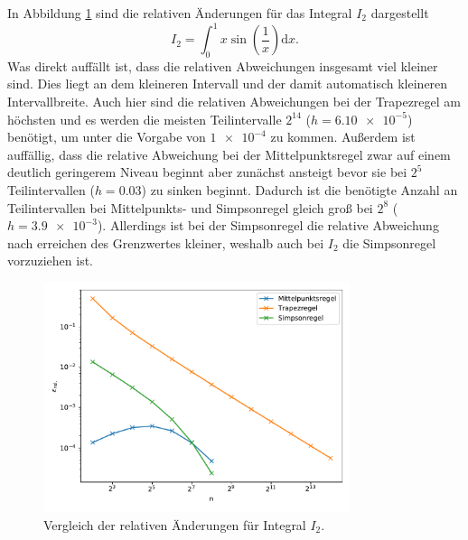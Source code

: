 In Abbildung \ref{fig:I2} sind die relativen Änderungen für das Integral \(I_2\) dargestellt
\begin{equation*}
  I_2 = \int_0^1 x \sin{\left(\frac{1}{x} \right)} \mathrm{d}x.
\end{equation*}
Was direkt auffällt ist, dass die relativen Abweichungen insgesamt viel kleiner sind. Dies liegt an dem kleineren Intervall und der damit automatisch kleineren Intervallbreite.
Auch hier sind die relativen Abweichungen bei der Trapezregel am höchsten und es werden die meisten Teilintervalle \(2^{14}\) (\(h=\num{6,10e-5}\)) benötigt, um unter die Vorgabe von \(\num{1e-4}\) zu kommen.
Außerdem ist auffällig, dass die relative Abweichung bei der Mittelpunktsregel zwar auf einem deutlich geringerem Niveau beginnt aber zunächst ansteigt bevor sie bei \(2^5\) Teilintervallen (\(h=\num{0,03}\)) zu sinken beginnt.
Dadurch ist die benötigte Anzahl an Teilintervallen bei Mittelpunkts- und Simpsonregel gleich groß bei \(2^8\) (\(h=\num{3,9e-3}\)).
Allerdings ist bei der Simpsonregel die relative Abweichung nach erreichen des Grenzwertes kleiner, weshalb auch bei \(I_2\) die Simpsonregel vorzuziehen ist.

\begin{figure}
  \includegraphics[width=0.8\textwidth]{A3/build/I2.pdf}
  \caption{Vergleich der relativen Änderungen für Integral \(I_2\).}
  \label{fig:I2}
\end{figure}

\FloatBarrier
